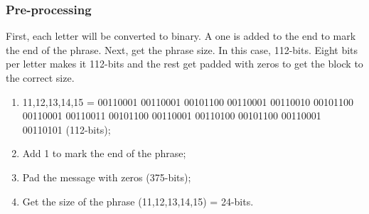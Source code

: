     
        
        \subsubsection{ Pre-processing}
        First, each letter will be converted to binary. A one is added to the end to mark the end of the phrase. Next, get the phrase size. In this case, 112-bits. Eight bits per letter makes it 112-bits and the rest get padded with zeros to get the block to the correct size. 
        
        \begin{enumerate}[label=\roman*.]
            
            \item 11,12,13,14,15 = 00110001 00110001 00101100 00110001 00110010 00101100 00110001 00110011 00101100 00110001 00110100 00101100 00110001 00110101 (112-bits);
            
            \item Add 1 to mark the end of the phrase;
            
            \item Pad the message with zeros (375-bits);
            
            \item Get the size of the phrase (11,12,13,14,15) = 24-bits.
            
        \end{enumerate}
        
